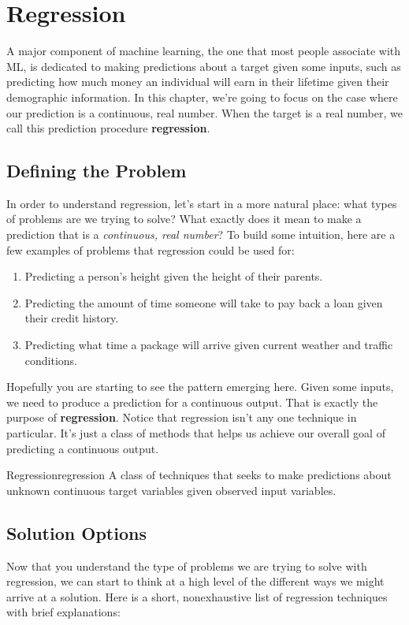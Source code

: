 \chapter{Regression}
A major component of machine learning, the one that most people associate with ML, is dedicated to making predictions about a target given some inputs, such as predicting how much money an individual will earn in their lifetime given their demographic information. In this chapter, we're going to focus on the case where our prediction is a continuous, real number. When the target is a real number, we call this prediction procedure \textbf{regression}.

\section{Defining the Problem}
In order to understand regression, let's start in a more natural place: what types of problems are we trying to solve? What exactly does it mean to make a prediction that is a \textit{continuous, real number}? To build some intuition, here are a few examples of problems that regression could be used for:

\begin{enumerate}
    \item Predicting a person's height given the height of their parents.
    \item Predicting the amount of time someone will take to pay back a loan given their credit history.
    \item Predicting what time a package will arrive given current weather and traffic conditions.
\end{enumerate}

Hopefully you are starting to see the pattern emerging here. Given some inputs, we need to produce a prediction for a continuous output. That is exactly the purpose of \textbf{regression}. Notice that regression isn't any one technique in particular. It's just a class of methods that helps us achieve our overall goal of predicting a continuous output.

\begin{definition}{Regression}{regression}
A class of techniques that seeks to make predictions about unknown continuous target variables given observed input variables.
\end{definition}

\section{Solution Options}
Now that you understand the type of problems we are trying to solve with regression, we can start to think at a high level of the different ways we might arrive at a solution. Here is a short, nonexhaustive list of regression techniques with brief explanations:

